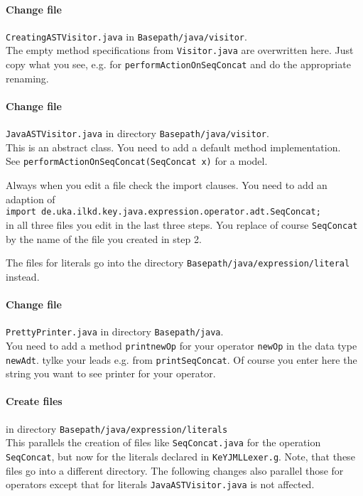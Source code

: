 \documentclass[11pt]{article}
\begin{document}
\paragraph{Change file} \verb+CreatingASTVisitor.java+  in 
\verb+Basepath/java/visitor+.\\[5pt]
The empty method specifications from  \verb+Visitor.java+ are overwritten here. 
Just copy what you see, e.g.
for  \verb+performActionOnSeqConcat+ and do the appropriate renaming.
\paragraph{Change file} \verb+JavaASTVisitor.java+  in directory
\verb+Basepath/java/visitor+.\\[5pt]
This is an abstract class. You need to add
a default method implementation.\\
See   \verb+performActionOnSeqConcat(SeqConcat x)+ for a model.

Always when you edit a file check the import clauses.
You need to add an adaption of\\[5pt]
\verb+import de.uka.ilkd.key.java.expression.operator.adt.SeqConcat;+
\\[5pt]
in all three files you edit in the last three steps. 
You replace of course \verb+SeqConcat+ by the name of the file you created in step 2.

The files for literals go into the directory \verb+Basepath/java/expression/literal+ instead.

\paragraph{Change file} \verb+PrettyPrinter.java+ in directory
\verb+Basepath/java+.\\[5pt]
You need to add a method \verb+printnewOp+ for your operator \verb+newOp+ in the data type
\verb+newAdt+. tylke your leads e.g. from \verb+printSeqConcat+. Of course you enter here the
string you want to see printer for your operator.

\paragraph{Create files} in directory \verb+Basepath/java/expression/literals+\\
This parallels the creation of files like  \verb+SeqConcat.java+ for the operation \verb+SeqConcat+, but now for 
the literals declared in   \verb+KeYJMLLexer.g+. Note, that these files go into a different directory.
The following changes also parallel those for operators except that for literals
 \verb+JavaASTVisitor.java+  is not affected.
\end{document}

